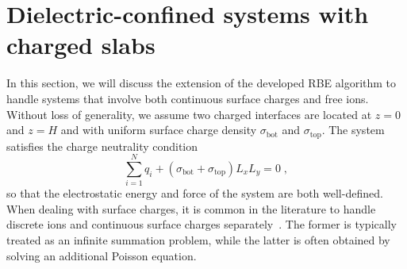\section{Dielectric-confined systems with charged slabs}\label{app::surfacecharge}

In this section, we will discuss the extension of the developed RBE algorithm to handle systems that involve both continuous surface charges and free ions. Without loss of generality, we assume two charged interfaces are located at $z=0$ and $z=H$ and with uniform surface charge density $\sigma_{\text{bot}}$ and $\sigma_{\text{top}}$. The system satisfies the charge neutrality condition \begin{equation}\label{eq::chargeneutrality}
    \sum_{i=1}^N q_i+(\sigma_{\text{bot}}+\sigma_{\text{top}})L_xL_y=0\;,
\end{equation}
so that the electrostatic energy and force of the system are both well-defined. When dealing with surface charges, it is common in the literature to handle discrete ions and continuous surface charges separately~\cite{spohr1997effect,yi2017note,yuan2021particle}. The former is typically treated as an infinite summation problem, while the latter is often obtained by solving an additional Poisson equation. %

